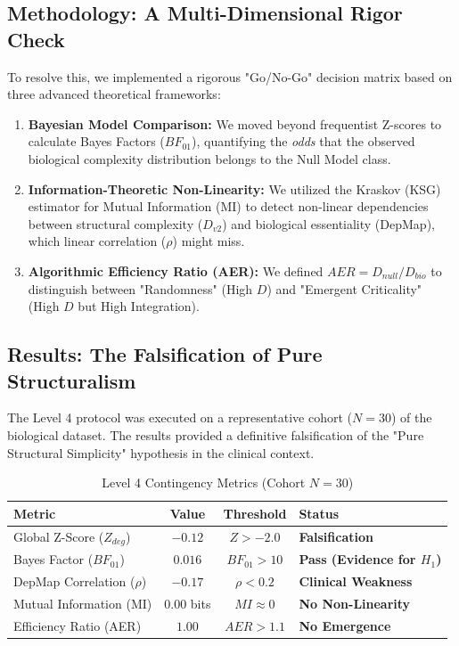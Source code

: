 \documentclass[11pt]{article}
\begin{document}
\subsection{Methodology: A Multi-Dimensional Rigor Check}
To resolve this, we implemented a rigorous "Go/No-Go" decision matrix based on three advanced theoretical frameworks:

\begin{enumerate}
    \item \textbf{Bayesian Model Comparison:} We moved beyond frequentist Z-scores to calculate Bayes Factors ($BF_{01}$), quantifying the \textit{odds} that the observed biological complexity distribution belongs to the Null Model class.
    \item \textbf{Information-Theoretic Non-Linearity:} We utilized the Kraskov (KSG) estimator for Mutual Information (MI) to detect non-linear dependencies between structural complexity ($D_{v2}$) and biological essentiality (DepMap), which linear correlation ($\rho$) might miss.
    \item \textbf{Algorithmic Efficiency Ratio (AER):} We defined $AER = D_{null} / D_{bio}$ to distinguish between "Randomness" (High $D$) and "Emergent Criticality" (High $D$ but High Integration).
\end{enumerate}

\subsection{Results: The Falsification of Pure Structuralism}
The Level 4 protocol was executed on a representative cohort ($N=30$) of the biological dataset. The results provided a definitive falsification of the "Pure Structural Simplicity" hypothesis in the clinical context.

\begin{table}[H]
\centering
\caption{Level 4 Contingency Metrics (Cohort $N=30$)}
\label{tab:lev4_metrics}
\begin{tabular}{@{}l c c l@{}}
\toprule
\textbf{Metric} & \textbf{Value} & \textbf{Threshold} & \textbf{Status} \\ \midrule
Global Z-Score ($Z_{deg}$) & $-0.12$ & $Z > -2.0$ & \textbf{Falsification} \\
Bayes Factor ($BF_{01}$) & $0.016$ & $BF_{01} > 10$ & \textbf{Pass (Evidence for $H_1$)} \\
DepMap Correlation ($\rho$) & $-0.17$ & $\rho < 0.2$ & \textbf{Clinical Weakness} \\
Mutual Information (MI) & $0.00$ bits & $MI \approx 0$ & \textbf{No Non-Linearity} \\
Efficiency Ratio (AER) & $1.00$ & $AER > 1.1$ & \textbf{No Emergence} \\ \bottomrule
\end{tabular}
\end{table}
\end{document}
